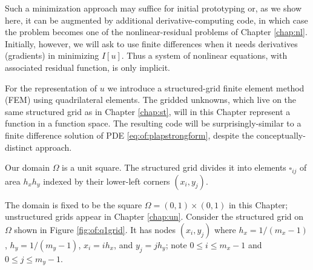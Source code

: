 Such a minimization approach may suffice for initial prototyping or, as we show here, it can be augmented by additional derivative-computing code, in which case the problem becomes one of the nonlinear-residual problems of Chapter \ref{chap:nl}.  Initially, however, we will ask \PETSc to use finite differences when it needs derivatives (gradients) in minimizing $I[u]$.  Thus a system of nonlinear equations, with associated residual function, is only implicit.

For the representation of $u$ we introduce a structured-grid finite element method (FEM) using quadrilateral elements.  The gridded unknowns, which live on the same structured grid as in Chapter \ref{chap:st}, will in this Chapter represent a function in a function space.  The resulting code will be surprisingly-similar to a finite difference solution of PDE \eqref{eq:of:plapstrongform}, despite the conceptually-distinct approach.

\begin{marginfigure}
\caption{Our domain $\Omega$ is a unit square.  The structured grid divides it into elements $\square_{ij}$ of area $h_x h_y$ indexed by their lower-left corners $(x_i,y_j)$.}
\label{fig:of:q1grid}
\end{marginfigure}

The domain is fixed to be the square $\Omega = (0,1)\times (0,1)$ in this Chapter; unstructured grids appear in Chapter \ref{chap:un}.  Consider the structured grid on $\Omega$ shown in Figure \ref{fig:of:q1grid}.  It has nodes $(x_i,y_j)$ where $h_x=1/(m_x-1)$, $h_y=1/(m_y-1)$, $x_i = i h_x$, and $y_j = j h_y$; note $0\le i \le m_x-1$ and $0 \le j \le m_y-1$.

